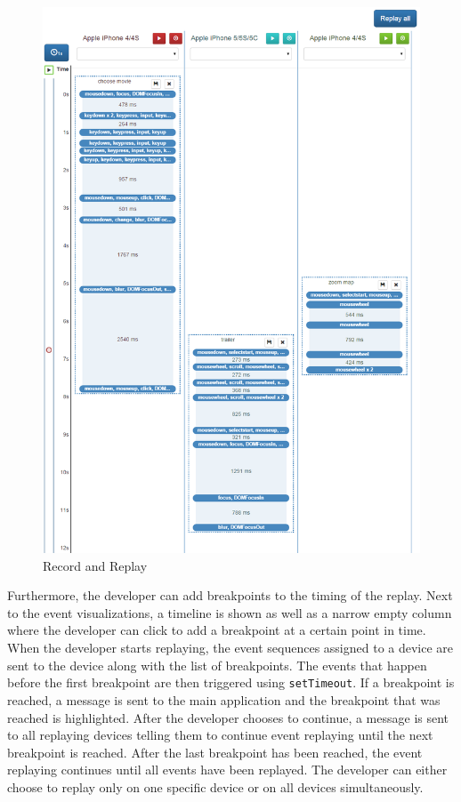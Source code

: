 \begin{figure}[H]
  \centering
    \includegraphics[width=1.0\textwidth]{images/screenshots/record_replay.png}
	\caption[Screenshot: Record and replay]{Record and Replay}
	\label{fig:record_replay}
\end{figure}

Furthermore, the developer can add breakpoints to the timing of the replay. Next to the event visualizations, a timeline is shown as well as a narrow empty column where the developer can click to add a breakpoint at a certain point in time. When the developer starts replaying, the event sequences assigned to a device are sent to the device along with the list of breakpoints. The events that happen before the first breakpoint are then triggered using \lstinline|setTimeout|. If a breakpoint is reached, a message is sent to the main application and the breakpoint that was reached is highlighted. After the developer chooses to continue, a message is sent to all replaying devices telling them to continue event replaying until the next breakpoint is reached. After the last breakpoint has been reached, the event replaying continues until all events have been replayed. The developer can either choose to replay only on one specific device or on all devices simultaneously. 

